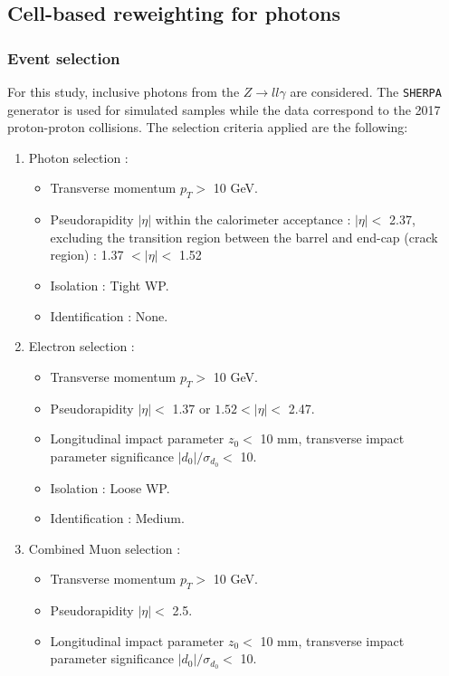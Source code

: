 \subsection{Cell-based reweighting for photons}
\label{gamma:ss:reweighting:photon}

\subsubsection{Event selection}
\label{gamma:ss:reweighting:photon:RadZSel}
For this study, inclusive photons from the $Z\rightarrow ll\gamma$ are considered. The \verb|SHERPA| generator is used for simulated samples while the data correspond to the 2017 proton-proton collisions. The selection criteria applied are the following:
\begin{enumerate}
    \item Photon selection :  
    \begin{itemize}
    \item Transverse momentum $p_T > $  10 GeV.
    \item Pseudorapidity $|\eta|$ within the calorimeter acceptance : $|\eta| < $ 2.37, excluding the transition region between the barrel and end-cap (crack region) : 1.37 $ < |\eta| < $ 1.52
    \item Isolation : Tight WP.
    \item Identification : None. 
\end{itemize}
    \item Electron selection :
    \begin{itemize}
        \item Transverse momentum $p_T > $ 10 GeV.
        \item Pseudorapidity $|\eta| < $ 1.37 or $1.52 < |\eta| < $ 2.47.
        \item Longitudinal impact parameter $z_0 < $ 10 mm, transverse impact parameter significance $|d_0|/\sigma_{d_0} < $ 10.
        \item Isolation : Loose WP.
        \item Identification : Medium.
    \end{itemize}
    \item Combined Muon selection : 
    \begin{itemize}
        \item Transverse momentum $p_T > $ 10 GeV.
        \item Pseudorapidity $|\eta| < $ 2.5.
        \item Longitudinal impact parameter $z_0 < $ 10 mm, transverse impact parameter significance $|d_0|/\sigma_{d_0} < $ 10.

\end{itemize}
\end{enumerate}
